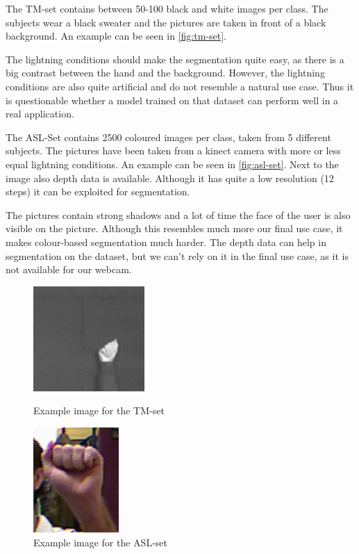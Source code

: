 \documentclass[letterpaper, 10 pt, conference]{ieeeconf}  %
\begin{document}
The TM-set contains between 50-100 black and white images per class. The subjects wear a black sweater and the pictures are taken in front of a black background. An example can be seen in \autoref{fig:tm-set}.

The lightning conditions should make the segmentation quite easy, as there is a big contrast between the hand and the background. However, the lightning conditions are also quite artificial and do not resemble a natural use case. Thus it is questionable whether a model trained on that dataset can perform well in a real application.

The ASL-Set contains 2500 coloured images per class, taken from 5 different subjects. The pictures have been taken from a kinect camera with more or less equal lightning conditions. An example can be seen in \autoref{fig:asl-set}. Next to the image also depth data is available. Although it has quite a low resolution (12 steps) it can be exploited for segmentation.

The pictures contain strong shadows and a lot of time the face of the user is also visible on the picture. Although this resembles much more our final use case, it makes colour-based segmentation much harder. The depth data can help in segmentation on the dataset, but we can't rely on it in the final use case, as it is not available for our webcam.

\begin{figure}
\centering
\begin{minipage}{0.4\linewidth}
\includegraphics[height=4cm]{a-tm}
\caption{Example image for the TM-set}
\label{fig:tm-set}
\end{minipage}
\hfill
\begin{minipage}{0.4\linewidth}
\includegraphics[height=4cm]{a-asl}
\caption{Example image for the ASL-set}
\label{fig:asl-set}
\end{minipage}
\end{figure}
\end{document}
